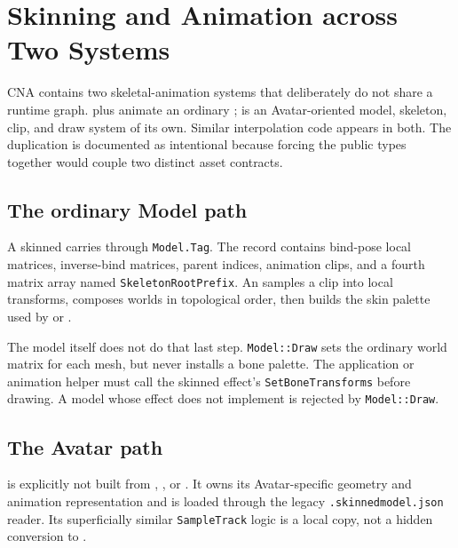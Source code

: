 \chapter{Skinning and Animation across Two Systems}
\label{ch:skinning-animation}

CNA contains two skeletal-animation systems that deliberately do not share a runtime graph.
 plus  animate an ordinary
;  is an Avatar-oriented model, skeleton, clip, and
draw system of its own. Similar interpolation code appears in both. The duplication is
documented as intentional because forcing the public types together would couple two distinct
asset contracts.



\section{The ordinary Model path}

A skinned  carries  through \texttt{Model.Tag}. The
record contains bind-pose local matrices, inverse-bind matrices, parent indices, animation
clips, and a fourth matrix array named \texttt{SkeletonRootPrefix}. An
 samples a clip into local transforms, composes worlds in topological
order, then builds the skin palette used by  or
.

The model itself does not do that last step. \texttt{Model::Draw} sets the ordinary
 world matrix for each mesh, but never installs a bone palette. The
application or animation helper must call the skinned effect's
\texttt{SetBoneTransforms} before drawing. A model whose effect does not implement
 is rejected by \texttt{Model::Draw}.

\section{The Avatar path}

 is explicitly not built from ,
, or . It owns its Avatar-specific geometry and
animation representation and is loaded through the legacy \texttt{.skinnedmodel.json} reader.
Its superficially similar \texttt{SampleTrack} logic is a local copy, not a hidden conversion
to .

